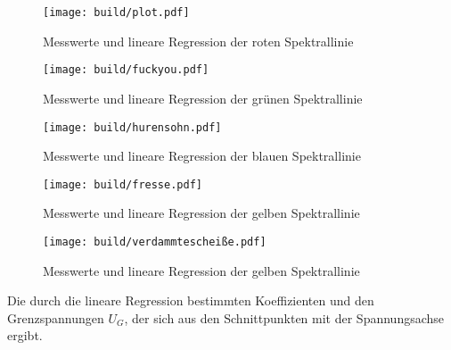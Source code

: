   \begin{figure}
    \centering
    \texttt{[image: build/plot.pdf]}
    \caption{Messwerte und lineare Regression der roten Spektrallinie}
    \label{fig:plot}
  \end{figure}
  \begin{figure}
    \centering
    \texttt{[image: build/fuckyou.pdf]}
    \caption{Messwerte und lineare Regression der grünen Spektrallinie}
    \label{fig:fuck}
  \end{figure}
  \begin{figure}
    \centering
    \texttt{[image: build/hurensohn.pdf]}
    \caption{Messwerte und lineare Regression der blauen Spektrallinie}
    \label{fig:hure}
  \end{figure}
  \begin{figure}
    \centering
    \texttt{[image: build/fresse.pdf]}
    \caption{Messwerte und lineare Regression der gelben Spektrallinie}
    \label{fig:fresse}
  \end{figure}
  \begin{figure}
    \centering
    \texttt{[image: build/verdammtescheiße.pdf]}
    \caption{Messwerte und lineare Regression der gelben Spektrallinie}
    \label{fig:scheisse}
  \end{figure}
  
  Die durch die lineare Regression bestimmten Koeffizienten und den Grenzspannungen $U_G$,
  der sich aus den Schnittpunkten mit der Spannungsachse ergibt.
  
